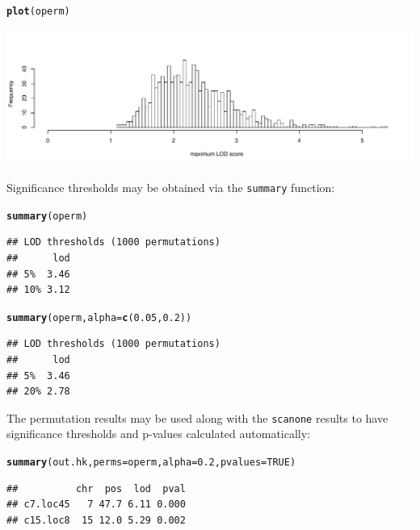 \documentclass[12pt]{article}\usepackage[]{graphicx}\usepackage[]{color}
\makeatletter
\def\maxwidth{ %
  \ifdim\Gin@nat@width>\linewidth
    \linewidth
  \else
    \Gin@nat@width
  \fi
}
\newcommand{\hlnum}[1]{\textcolor[rgb]{0.686,0.059,0.569}{#1}}%
\newcommand{\hlstd}[1]{\textcolor[rgb]{0.345,0.345,0.345}{#1}}%
\newcommand{\hlkwc}[1]{\textcolor[rgb]{0.333,0.667,0.333}{#1}}%
\newcommand{\hlkwd}[1]{\textcolor[rgb]{0.737,0.353,0.396}{\textbf{#1}}}%
\newenvironment{kframe}{%
 \def\at@end@of@kframe{}%
 \ifinner\ifhmode%
  \def\at@end@of@kframe{\end{minipage}}%
  \begin{minipage}{\columnwidth}%
 \fi\fi%
 \def\FrameCommand##1{\hskip\@totalleftmargin \hskip-\fboxsep
 \colorbox{shadecolor}{##1}\hskip-\fboxsep
     \hskip-\linewidth \hskip-\@totalleftmargin \hskip\columnwidth}%
 \MakeFramed {\advance\hsize-\width
   \@totalleftmargin\z@ \linewidth\hsize
   \@setminipage}}%
 {\par\unskip\endMakeFramed%
 \at@end@of@kframe}
\newenvironment{knitrout}{}{} %
\makeatother
\begin{document}
\begin{knitrout}
\color{fgcolor}\begin{kframe}
\begin{alltt}
\hlkwd{plot}\hlstd{(operm)}
\end{alltt}
\end{kframe}
\includegraphics[width=\maxwidth]{RnwFigs/plot_perm-1} 

\end{knitrout}

Significance thresholds may be obtained via the {\tt summary}
function:

\begin{knitrout}
\color{fgcolor}\begin{kframe}
\begin{alltt}
\hlkwd{summary}\hlstd{(operm)}
\end{alltt}
\begin{verbatim}
## LOD thresholds (1000 permutations)
##      lod
## 5%  3.46
## 10% 3.12
\end{verbatim}
\begin{alltt}
\hlkwd{summary}\hlstd{(operm,} \hlkwc{alpha}\hlstd{=}\hlkwd{c}\hlstd{(}\hlnum{0.05}\hlstd{,} \hlnum{0.2}\hlstd{))}
\end{alltt}
\begin{verbatim}
## LOD thresholds (1000 permutations)
##      lod
## 5%  3.46
## 20% 2.78
\end{verbatim}
\end{kframe}
\end{knitrout}

The permutation results may be used along with
the {\tt scanone} results to have significance thresholds and
p-values calculated automatically:

\begin{knitrout}
\color{fgcolor}\begin{kframe}
\begin{alltt}
\hlkwd{summary}\hlstd{(out.hk,} \hlkwc{perms}\hlstd{=operm,} \hlkwc{alpha}\hlstd{=}\hlnum{0.2}\hlstd{,} \hlkwc{pvalues}\hlstd{=}\hlnum{TRUE}\hlstd{)}
\end{alltt}
\begin{verbatim}
##          chr  pos  lod  pval
## c7.loc45   7 47.7 6.11 0.000
## c15.loc8  15 12.0 5.29 0.002
\end{verbatim}
\end{kframe}
\end{knitrout}
\end{document}
